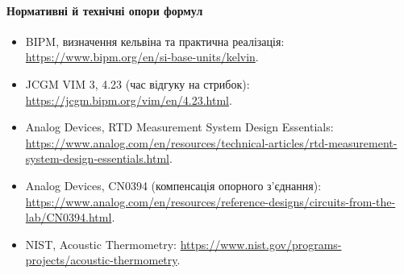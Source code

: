 \documentclass[11pt,a4paper]{article}
\begin{document}
\paragraph{Нормативні й технічні опори формул}
\small
\begin{itemize}
\item BIPM, визначення кельвіна та практична реалізація:
\url{https://www.bipm.org/en/si-base-units/kelvin}.
\item JCGM VIM 3, 4.23 (час відгуку на стрибок):
\url{https://jcgm.bipm.org/vim/en/4.23.html}.
\item Analog Devices, RTD Measurement System Design Essentials:
\url{https://www.analog.com/en/resources/technical-articles/rtd-measurement-system-design-essentials.html}.
\item Analog Devices, CN0394 (компенсація опорного з'єднання):
\url{https://www.analog.com/en/resources/reference-designs/circuits-from-the-lab/CN0394.html}.
\item NIST, Acoustic Thermometry:
\url{https://www.nist.gov/programs-projects/acoustic-thermometry}.
\end{itemize}
\end{document}
